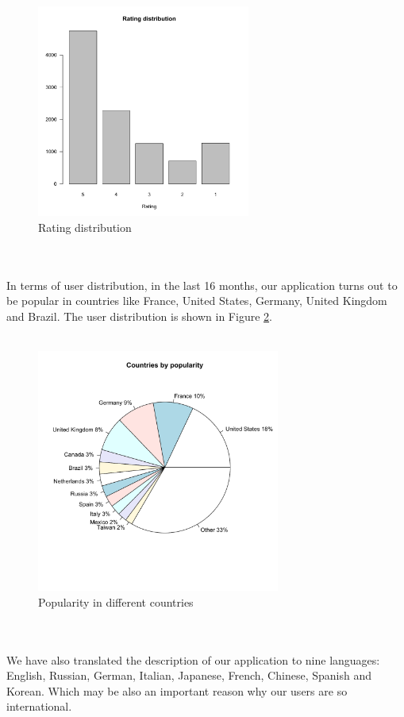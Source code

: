 \\
\begin{figure}[htb]
\centering \includegraphics[height=7cm]{charts/rating_distribution}
\caption{Rating distribution\label{ratings}}
\end{figure}\\
\\
In terms of user distribution, in the last 16 months, our application turns out
to be popular in countries like France, United States, Germany, United Kingdom
and Brazil. The user distribution is shown in Figure \ref{user_country}.\\
\\
\begin{figure}[htb]
\centering \includegraphics[height=8cm]{charts/country_popularity}
\caption{Popularity in different countries \label{user_country}}
\end{figure}\\
\\
We have also translated the description of our application to nine languages:
 English, Russian, German, Italian, Japanese, French, Chinese, Spanish and Korean. Which may be also an important reason why our users are so international.\\
